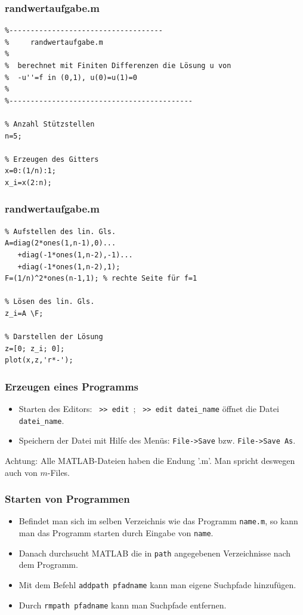 \begin{frame}[fragile]\frametitle{randwertaufgabe.m}
\begin{lstlisting}
%------------------------------------
%     randwertaufgabe.m 
%   
%  berechnet mit Finiten Differenzen die Lösung u von
%  -u''=f in (0,1), u(0)=u(1)=0
%
%-------------------------------------------

% Anzahl Stützstellen
n=5;

% Erzeugen des Gitters
x=0:(1/n):1;
x_i=x(2:n);
\end{lstlisting}
\end{frame}

\begin{frame}[fragile]\frametitle{randwertaufgabe.m}
\begin{lstlisting}
% Aufstellen des lin. Gls.
A=diag(2*ones(1,n-1),0)...
   +diag(-1*ones(1,n-2),-1)...
   +diag(-1*ones(1,n-2),1);
F=(1/n)^2*ones(n-1,1); % rechte Seite für f=1 

% Lösen des lin. Gls.
z_i=A \F;

% Darstellen der Lösung
z=[0; z_i; 0];
plot(x,z,'r*-');
\end{lstlisting}
\end{frame}

\begin{frame}[fragile]\frametitle{Erzeugen eines Programms}
\begin{itemize}
\item Starten des Editors: \lstinline! >> edit !; \lstinline! >> edit datei_name!
  öffnet die Datei \lstinline!datei_name!.
\item Speichern der Datei mit Hilfe des Menüs: \lstinline!File->Save!
  bzw. \lstinline!File->Save As!.
\end{itemize}
\alert{Achtung:} Alle MATLAB-Dateien haben die Endung '.m'. Man
spricht deswegen auch von $m$-Files.
\end{frame}

\begin{frame}[fragile]\frametitle{Starten von Programmen}
\begin{itemize}
\item Befindet man sich im selben Verzeichnis wie das Programm
  \lstinline!name.m!, so kann man das Programm starten durch Eingabe von  
\lstinline!name!. 
\item Danach durchsucht MATLAB die in \alert{ \lstinline!path!} angegebenen
  Verzeichnisse nach dem Programm.
\item Mit dem Befehl \lstinline!addpath pfadname! kann man eigene Suchpfade
  hinzufügen.  
\item Durch \lstinline!rmpath pfadname! kann man Suchpfade entfernen.  
\end{itemize}
\end{frame}

